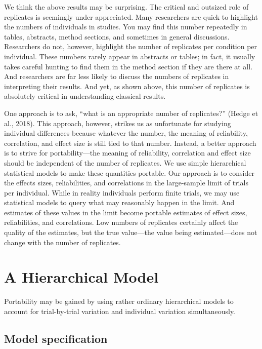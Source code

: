 \documentclass[english,man]{apa6}
\theoremstyle{definition}
\theoremstyle{definition}
\theoremstyle{remark}
\begin{document}
We think the above results may be surprising. The critical and outsized
role of replicates is seemingly under appreciated. Many researchers are
quick to highlight the numbers of individuals in studies. You may find
this number repeatedly in tables, abstracts, method sections, and
sometimes in general discussions. Researchers do not, however, highlight
the number of replicates per condition per individual. These numbers
rarely appear in abstracts or tables; in fact, it usually takes careful
hunting to find them in the method section if they are there at all. And
researchers are far less likely to discuss the numbers of replicates in
interpreting their results. And yet, as shown above, this number of
replicates is absolutely critical in understanding classical results.

One approach is to ask, \enquote{what is an appropriate number of
replicates?} (Hedge et al., 2018). This approach, however, strikes us as
unfortunate for studying individual differences because whatever the
number, the meaning of reliability, correlation, and effect size is
still tied to that number. Instead, a better approach is to strive for
portability---the meaning of reliability, correlation and effect size
should be independent of the number of replicates. We use simple
hierarchical statistical models to make these quantities portable. Our
approach is to consider the effects sizes, reliabilities, and
correlations in the large-sample limit of trials per individual. While
in reality individuals perform finite trials, we may use statistical
models to query what may reasonably happen in the limit. And estimates
of these values in the limit become portable estimates of effect sizes,
reliabilities, and correlations. Low numbers of replicates certainly
affect the quality of the estimates, but the true value---the value
being estimated---does not change with the number of replicates.

\section{A Hierarchical Model}\label{a-hierarchical-model}

Portability may be gained by using rather ordinary hierarchical models
to account for trial-by-trial variation and individual variation
simultaneously.

\subsection{Model specification}\label{model-specification}
\end{document}
